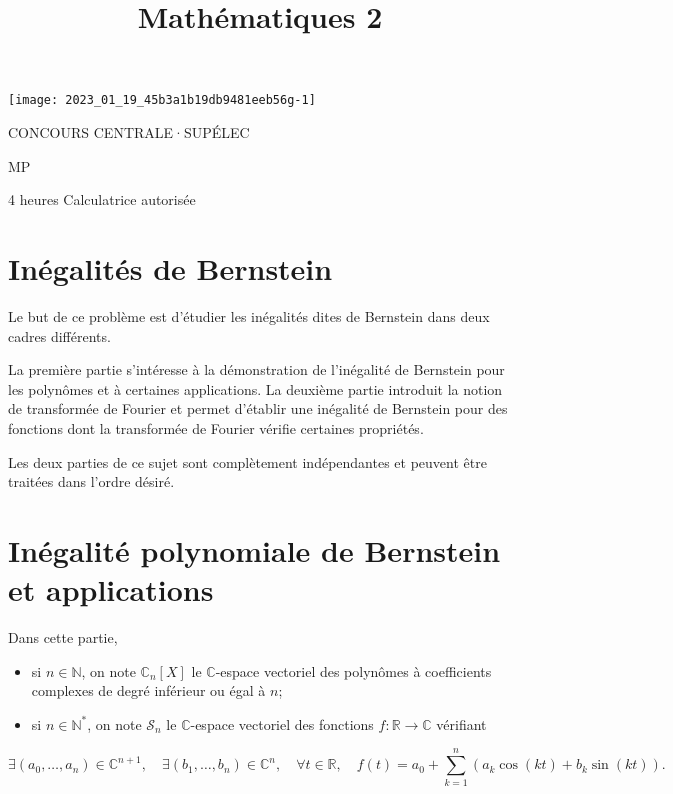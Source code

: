 \documentclass[10pt]{article}
\title{Mathématiques 2 }
\author{}
\date{}
\begin{document}
\maketitle
\begin{center}
\texttt{[image: 2023\_01\_19\_45b3a1b19db9481eeb56g-1]}
\end{center}

CONCOURS CENTRALE·SUPÉLEC

MP

4 heures Calculatrice autorisée

\section{Inégalités de Bernstein}
Le but de ce problème est d'étudier les inégalités dites de Bernstein dans deux cadres différents.

La première partie s'intéresse à la démonstration de l'inégalité de Bernstein pour les polynômes et à certaines applications. La deuxième partie introduit la notion de transformée de Fourier et permet d'établir une inégalité de Bernstein pour des fonctions dont la transformée de Fourier vérifie certaines propriétés.

Les deux parties de ce sujet sont complètement indépendantes et peuvent être traitées dans l'ordre désiré.

\section{Inégalité polynomiale de Bernstein et applications}
Dans cette partie,

\begin{itemize}
  \item si $n \in \mathbb{N}$, on note $\mathbb{C}_{n}[X]$ le $\mathbb{C}$-espace vectoriel des polynômes à coefficients complexes de degré inférieur ou égal à $n$;

  \item si $n \in \mathbb{N}^{*}$, on note $\mathcal{S}_{n}$ le $\mathbb{C}$-espace vectoriel des fonctions $f: \mathbb{R} \rightarrow \mathbb{C}$ vérifiant

\end{itemize}

$$
\exists\left(a_{0}, \ldots, a_{n}\right) \in \mathbb{C}^{n+1}, \quad \exists\left(b_{1}, \ldots, b_{n}\right) \in \mathbb{C}^{n}, \quad \forall t \in \mathbb{R}, \quad f(t)=a_{0}+\sum_{k=1}^{n}\left(a_{k} \cos (k t)+b_{k} \sin (k t)\right) .
$$
\end{document}

